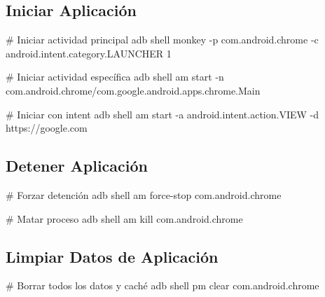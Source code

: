 \documentclass[
  doc,
  floatsintext,
  longtable,
  a4paper,
  nolmodern,
  notxfonts,
  notimes,
  12pt,
  colorlinks=true,linkcolor=blue,citecolor=blue,urlcolor=blue]{apa7}
\newenvironment{Shaded}{\begin{snugshade}}{\end{snugshade}}
\newcommand{\AttributeTok}[1]{\textcolor[rgb]{0.40,0.45,0.13}{#1}}
\newcommand{\CommentTok}[1]{\textcolor[rgb]{0.37,0.37,0.37}{#1}}
\newcommand{\ExtensionTok}[1]{\textcolor[rgb]{0.00,0.23,0.31}{#1}}
\newcommand{\NormalTok}[1]{\textcolor[rgb]{0.00,0.23,0.31}{#1}}
\begin{document}
\subsection{Iniciar Aplicación}\label{iniciar-aplicaciuxf3n}

\begin{Shaded}
\begin{Highlighting}[]
\CommentTok{\# Iniciar actividad principal}
\ExtensionTok{adb}\NormalTok{ shell monkey }\AttributeTok{{-}p}\NormalTok{ com.android.chrome }\AttributeTok{{-}c}\NormalTok{ android.intent.category.LAUNCHER 1}

\CommentTok{\# Iniciar actividad específica}
\ExtensionTok{adb}\NormalTok{ shell am start }\AttributeTok{{-}n}\NormalTok{ com.android.chrome/com.google.android.apps.chrome.Main}

\CommentTok{\# Iniciar con intent}
\ExtensionTok{adb}\NormalTok{ shell am start }\AttributeTok{{-}a}\NormalTok{ android.intent.action.VIEW }\AttributeTok{{-}d}\NormalTok{ https://google.com}
\end{Highlighting}
\end{Shaded}

\subsection{Detener Aplicación}\label{detener-aplicaciuxf3n}

\begin{Shaded}
\begin{Highlighting}[]
\CommentTok{\# Forzar detención}
\ExtensionTok{adb}\NormalTok{ shell am force{-}stop com.android.chrome}

\CommentTok{\# Matar proceso}
\ExtensionTok{adb}\NormalTok{ shell am kill com.android.chrome}
\end{Highlighting}
\end{Shaded}

\subsection{Limpiar Datos de
Aplicación}\label{limpiar-datos-de-aplicaciuxf3n}

\begin{Shaded}
\begin{Highlighting}[]
\CommentTok{\# Borrar todos los datos y caché}
\ExtensionTok{adb}\NormalTok{ shell pm clear com.android.chrome}
\end{Highlighting}
\end{Shaded}
\end{document}
